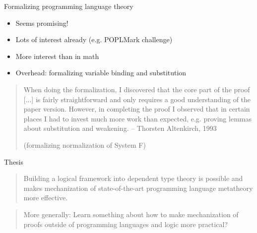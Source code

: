 \documentclass[usenames,dvipsnames]{beamer}
\begin{document}
\begin{frame}{Formalizing programming language theory}
\begin{itemize}
\item Seems promising!
\item Lots of interest already (e.g. POPLMark challenge)
\item More interest than in math
\pause
\item Overhead: formalizing variable binding and substitution
\end{itemize}
\pause
\begin{quote}
When doing the formalization, I discovered that the core part of the
proof [...] is fairly straightforward and
only requires a good understanding of the paper version. However, in
completing the proof I observed that in certain places I had to invest
much more work than expected, e.g. proving lemmas about substitution
and weakening. -- Thorsten Altenkirch, 1993

   (formalizing normalization of System F)
\end{quote}
\end{frame}

\begin{frame}{Thesis}
\begin{quote}Building a logical framework into dependent type
theory is possible and makes mechanization of state-of-the-art programming
language metatheory more effective.
\end{quote} %

\pause\begin{quote}{\normalfont More generally: Learn something about how
to make mechanization of proofs outside of programming languages and
logic more practical?}\end{quote}
\end{frame}
\end{document}
